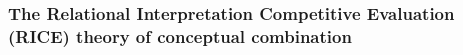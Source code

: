 



\subsubsection{The
Relational Interpretation Competitive Evaluation (RICE) theory of
conceptual combination
}
\label{sec:rice}


